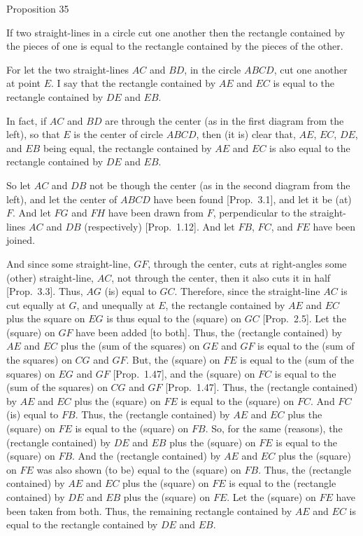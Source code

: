 
\begin{center}
{\large Proposition 35}
\end{center}

If two straight-lines in a circle cut one another then the rectangle
contained by the pieces of one is equal to the rectangle contained
by the pieces of the other.

\epsfysize=1.5in
\centerline{}

For let the two straight-lines $AC$ and $BD$, in the circle $ABCD$,
cut one another at  point $E$. I say that the rectangle contained by
$AE$ and $EC$ is equal to the rectangle contained  by $DE$ and $EB$.

In fact, if $AC$ and $BD$ are through the center (as in the first diagram from the left), so that $E$ is the center
of circle $ABCD$, then (it is) clear that, $AE$, $EC$, $DE$, and $EB$ being equal,
the rectangle contained by $AE$ and $EC$ is also equal to the rectangle
contained by $DE$ and $EB$.

So let $AC$ and $DB$ not be though the center (as in the second diagram from the left), and let the center of $ABCD$ have
been found [Prop.~3.1], and let it be (at) $F$. And let $FG$ and $FH$
have been drawn from $F$, perpendicular to the straight-lines $AC$ and $DB$
(respectively) [Prop.~1.12]. And let $FB$, $FC$, and $FE$ have
been joined.

And since some straight-line, $GF$, through the center, cuts at right-angles  some (other) straight-line, $AC$, not through the center,  then it also cuts
it in half [Prop.~3.3]. Thus, $AG$ (is) equal to $GC$. Therefore,
since the straight-line $AC$ is cut equally at $G$, and unequally at $E$,
the rectangle contained by $AE$ and $EC$ plus the square on $EG$ is thus
equal to the (square) on $GC$ [Prop.~2.5]. Let the (square) on
$GF$ have been added [to both]. Thus, the (rectangle contained) by 
$AE$ and $EC$ plus the (sum of the squares) on $GE$ and $GF$ is equal to
the (sum of the squares) on $CG$ and $GF$. But, the (square) on $FE$ is equal to the (sum of the squares)
on $EG$ and $GF$   [Prop.~1.47],
and the (square)
on $FC$  is equal to the (sum of the squares) on $CG$ and $GF$ [Prop.~1.47]. Thus, the (rectangle contained) by
$AE$ and $EC$ plus the (square) on $FE$ is equal to the (square) on $FC$.
And $FC$ (is) equal to $FB$. Thus, the (rectangle contained) by
$AE$ and $EC$ plus the (square) on $FE$ is equal to the (square) on $FB$.
So, for the same (reasons), the (rectangle contained) by
$DE$ and $EB$ plus the (square) on $FE$ is equal to the (square) on $FB$.
And the (rectangle contained) by
$AE$ and $EC$ plus the (square) on $FE$ was also shown (to be) equal to the (square) on $FB$. Thus,  the (rectangle contained) by
$AE$ and $EC$ plus the (square) on $FE$ is equal to the (rectangle contained) by
$DE$ and $EB$ plus the (square) on $FE$. Let the (square) on $FE$ have been
taken from both. Thus, the remaining rectangle contained by $AE$ and
$EC$ is equal to the rectangle contained by $DE$ and $EB$.

